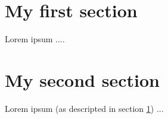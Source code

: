 \section{My first section}
\label{sec:first}

Lorem ipsum ....

\section{My second section}
\label{sec:second}

Lorem ipsum (as descripted in section \ref{sec:first}) ...
